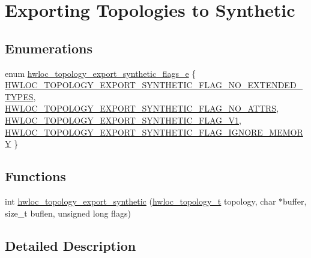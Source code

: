 \hypertarget{a00207}{}\section{Exporting Topologies to Synthetic}
\label{a00207}
\subsection*{Enumerations}
\begin{DoxyCompactItemize}
\item 
enum \hyperlink{a00207_ga7ac6f97cc40bd50c40285084f869ba63}{hwloc\+\_\+topology\+\_\+export\+\_\+synthetic\+\_\+flags\+\_\+e} \{ \hyperlink{a00207_gga7ac6f97cc40bd50c40285084f869ba63a3b3bd4ba2ef9990810865e561034ccc9}{H\+W\+L\+O\+C\+\_\+\+T\+O\+P\+O\+L\+O\+G\+Y\+\_\+\+E\+X\+P\+O\+R\+T\+\_\+\+S\+Y\+N\+T\+H\+E\+T\+I\+C\+\_\+\+F\+L\+A\+G\+\_\+\+N\+O\+\_\+\+E\+X\+T\+E\+N\+D\+E\+D\+\_\+\+T\+Y\+P\+ES}, 
\hyperlink{a00207_gga7ac6f97cc40bd50c40285084f869ba63aaa2702ffba050bab079b3041aec737d4}{H\+W\+L\+O\+C\+\_\+\+T\+O\+P\+O\+L\+O\+G\+Y\+\_\+\+E\+X\+P\+O\+R\+T\+\_\+\+S\+Y\+N\+T\+H\+E\+T\+I\+C\+\_\+\+F\+L\+A\+G\+\_\+\+N\+O\+\_\+\+A\+T\+T\+RS}, 
\hyperlink{a00207_gga7ac6f97cc40bd50c40285084f869ba63a7896bdf4ccfcdcd09a9f76c0f5e3a5b8}{H\+W\+L\+O\+C\+\_\+\+T\+O\+P\+O\+L\+O\+G\+Y\+\_\+\+E\+X\+P\+O\+R\+T\+\_\+\+S\+Y\+N\+T\+H\+E\+T\+I\+C\+\_\+\+F\+L\+A\+G\+\_\+\+V1}, 
\hyperlink{a00207_gga7ac6f97cc40bd50c40285084f869ba63a22c57cf18e1da4a6c584fb783b552f9f}{H\+W\+L\+O\+C\+\_\+\+T\+O\+P\+O\+L\+O\+G\+Y\+\_\+\+E\+X\+P\+O\+R\+T\+\_\+\+S\+Y\+N\+T\+H\+E\+T\+I\+C\+\_\+\+F\+L\+A\+G\+\_\+\+I\+G\+N\+O\+R\+E\+\_\+\+M\+E\+M\+O\+RY}
 \}
\end{DoxyCompactItemize}
\subsection*{Functions}
\begin{DoxyCompactItemize}
\item 
int \hyperlink{a00207_ga24b7864a1c588309c4749f621f03b4c7}{hwloc\+\_\+topology\+\_\+export\+\_\+synthetic} (\hyperlink{a00186_ga9d1e76ee15a7dee158b786c30b6a6e38}{hwloc\+\_\+topology\+\_\+t} topology, char $\ast$buffer, size\+\_\+t buflen, unsigned long flags)
\end{DoxyCompactItemize}


\subsection{Detailed Description}



